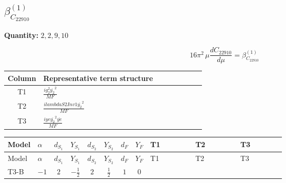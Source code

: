 \documentclass[8pt]{article}
\begin{document}
\begin{landscape}
\section*{$\beta_{C_{22910}}^{(1)}$}
\noindent\textbf{Quantity: }$\mathrm{2,2,9,10}$\par\smallskip
\[16\pi^2\,\mu\frac{d C_{22910}}{d\mu}=\beta_{C_{22910}}^{(1)}\]
\begin{center}
\begin{tabular}{@{}c >{\raggedright\arraybackslash}p{0.82\linewidth}@{}}
\toprule
Column & Representative term structure \\
\midrule
T1 & \(\displaystyle \frac{i g_{2}^{2} \overline{y_{2}}^{2}}{MF}\) \\
\midrule
T2 & \(\displaystyle \frac{i lambdaS2Inv1 \overline{y_{2}}^{2}}{MF}\) \\
\midrule
T3 & \(\displaystyle \frac{i ye \overline{y_{2}}^{2} \overline{ye}}{MF}\) \\
\midrule
\bottomrule
\end{tabular}
\end{center}
\smallskip
\tiny
\begin{longtable}{@{}llcccccc >{\raggedright\arraybackslash}p{0.21\linewidth} >{\raggedright\arraybackslash}p{0.21\linewidth} >{\raggedright\arraybackslash}p{0.21\linewidth}@{}}
\toprule
Model & $\alpha$ & $d_{S_1}$ & $Y_{S_1}$ & $d_{S_2}$ & $Y_{S_2}$ & $d_F$ & $Y_F$ & T1 & T2 & T3 \\
\midrule
\endfirsthead
\toprule
Model & $\alpha$ & $d_{S_1}$ & $Y_{S_1}$ & $d_{S_2}$ & $Y_{S_2}$ & $d_F$ & $Y_F$ & T1 & T2 & T3 \\
\midrule
\endhead
T3-B & $-1$ & $2$ & $-\frac{1}{2}$ & $2$ & $\frac{1}{2}$ & $1$ & $0$ & \scriptsize\adjustbox{max width=\linewidth}{$\begin{gathered} - \frac{3 i g_{2}^{2} \overline{y_{2}}^{2}}{4 MF}\end{gathered}$} & \scriptsize\adjustbox{max width=\linewidth}{$\begin{gathered} - \frac{i lambdaS2Inv1 \overline{y_{2}}^{2}}{2 MF}\end{gathered}$} & \scriptsize\adjustbox{max width=\linewidth}{$\begin{gathered} \frac{i ye \overline{y_{2}}^{2} \overline{ye}}{4 MF}\end{gathered}$} \\
\midrule
\bottomrule
\end{longtable}
\clearpage

\end{landscape}
\end{document}
